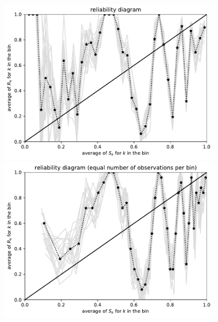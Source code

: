 \documentclass{article}
\begin{document}
\begin{figure}
\begin{centering}
\parbox{\imsize}{\includegraphics[width=\imsize]
                {./codes/unweighted/1000_40_2_1/equiprob.pdf}}
\quad\quad
\parbox{\imsize}{\includegraphics[width=\imsize]
                {./codes/unweighted/1000_40_2_1/equisamp.pdf}}

\vspace{\vertsep}


\end{centering}
\end{figure}
\end{document}
